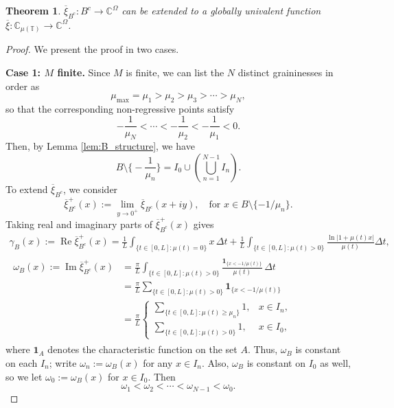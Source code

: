 \documentclass[10pt,a4paper]{amsart}
\numberwithin{equation}{section}
\newtheorem{theorem}{Theorem}[section]
\begin{document}
\begin{theorem}
\label{thm:GlobalUnivalence}
$\overline{\xi}_{B^c}:B^c \to \mathbb{C}^{\Omega}$ can be extended to a globally univalent function
$\overline{\xi}:\mathbb{C}_{\mu(\mathbb{T})} \to \mathbb{C}^{\Omega}$.
\end{theorem}

\begin{proof}
We present the proof in two cases.
\smallskip

\noindent\textbf{Case 1: $M$ finite.}
Since $M$ is finite, we can list the $N$ distinct graininesses in order as
 \[
 \mu_{\max}=\mu_1>\mu_2>\mu_3>\cdots>\mu_N,
 \]
so that the corresponding non-regressive points satisfy
 \[
 -\frac{1}{\mu_N} < \cdots < -\frac{1}{\mu_2} < -\frac{1}{\mu_1} < 0.
 \]
Then, by Lemma \ref{lem:B_structure}, we have
$$
 B\setminus \Big\{-\frac{1}{\mu_n}\Big\}
 = I_0 \cup \left(\bigcup_{n=1}^{N-1} I_n\right).
$$
To extend $\overline{\xi}_{B^c}$, we consider
\begin{equation}\label{setup}
 \overline{\xi}_{B^c}^+(x):=\lim_{y\to 0^+}\overline{\xi}_{B^c}(x+iy),
 \quad\text{for } x\in B\setminus\{-1/\mu_n\}.
\end{equation}
Taking real and imaginary parts of $\overline{\xi}_{B^c}^+(x)$ gives
\begin{gather*}
 \gamma_B(x):=\operatorname{Re} \overline{\xi}_{B^c}^+(x)
 =\frac{1}{L}\int_{\{t\in[0,L]:\mu(t)=0\}} x\,\Delta t
  + \frac{1}{L}\int_{\{t\in[0,L]:\mu(t)>0\}} \frac{\ln|1+\mu(t) x|}{\mu(t)}
  \Delta t,
\\
\begin{aligned}
 \omega_B(x):=\operatorname{Im} \overline{\xi}_{B^c}^+(x)
 &=\frac{\pi}{L}\int_{\{t\in[0,L]:\mu(t)>0\}}
  \frac{\mathbf 1_{\{x<-1/\mu(t)\}}}{\mu(t)}\,\Delta t\\
 &=\frac{\pi}{L} \sum_{\{t\in[0,L]:\mu(t)>0\}} \mathbf 1_{\{x<-1/\mu(t)\}}\\
 &=\frac{\pi}{L}
 \begin{cases}
 \sum_{\{t\in[0,L]:\mu(t)\ge \mu_n\}} 1, & x\in I_n,\\
 \sum_{\{t\in[0,L]:\mu(t)>0\}} 1, & x\in I_0,
 \end{cases}
\end{aligned}
\end{gather*}
where $\mathbf{1}_A$ denotes the characteristic function on the set $A$.
Thus, $\omega_B$ is constant on each $I_n$; write $\omega_n:=\omega_B(x)$ for any
$x\in I_n$. Also, $\omega_B$ is constant on $I_0$ as well, so we let
$\omega_0:=\omega_B(x)$ for $x\in I_0$. Then
 $$
 \omega_1<\omega_2<\cdots<\omega_{N-1}<\omega_0.
 $$


\end{proof}
\end{document}
